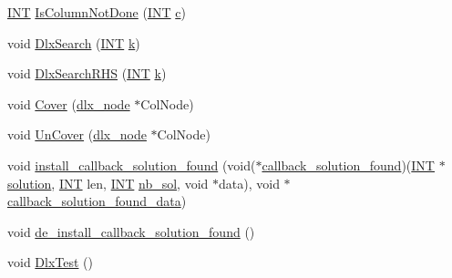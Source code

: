 \begin{DoxyCompactItemize}
\item 
\mbox{\hyperlink{galois_8h_a09fddde158a3a20bd2dcadb609de11dc}{I\+NT}} \mbox{\hyperlink{_l_i_b_2_g_a_l_o_i_s_2dlx_8_c_ade91df62267ccf3ec706530c9057167d}{Is\+Column\+Not\+Done}} (\mbox{\hyperlink{galois_8h_a09fddde158a3a20bd2dcadb609de11dc}{I\+NT}} \mbox{\hyperlink{alphabet2_8_c_a4e1e0e72dd773439e333c84dd762a9c3}{c}})
\item 
void \mbox{\hyperlink{_l_i_b_2_g_a_l_o_i_s_2dlx_8_c_a71f59e229697fd713666715446438998}{Dlx\+Search}} (\mbox{\hyperlink{galois_8h_a09fddde158a3a20bd2dcadb609de11dc}{I\+NT}} \mbox{\hyperlink{simeon_8_c_a43fa990200c3ddd47c35f151bd4d66bf}{k}})
\item 
void \mbox{\hyperlink{_l_i_b_2_g_a_l_o_i_s_2dlx_8_c_acea905e4026b82ace11f244c1c173af7}{Dlx\+Search\+R\+HS}} (\mbox{\hyperlink{galois_8h_a09fddde158a3a20bd2dcadb609de11dc}{I\+NT}} \mbox{\hyperlink{simeon_8_c_a43fa990200c3ddd47c35f151bd4d66bf}{k}})
\item 
void \mbox{\hyperlink{_l_i_b_2_g_a_l_o_i_s_2dlx_8_c_a779523d7d194ac8ee94af5f6c754a3f1}{Cover}} (\mbox{\hyperlink{structdlx__node}{dlx\+\_\+node}} $\ast$Col\+Node)
\item 
void \mbox{\hyperlink{_l_i_b_2_g_a_l_o_i_s_2dlx_8_c_ae438e7c2e37e310d1981d3a7be44613d}{Un\+Cover}} (\mbox{\hyperlink{structdlx__node}{dlx\+\_\+node}} $\ast$Col\+Node)
\item 
void \mbox{\hyperlink{_l_i_b_2_g_a_l_o_i_s_2dlx_8_c_a69c3d94a3b3f3520355fc78794c82783}{install\+\_\+callback\+\_\+solution\+\_\+found}} (void($\ast$\mbox{\hyperlink{_l_i_b_2_g_a_l_o_i_s_2dlx_8_c_a2cb295d6c07a8de393c5107d81da5066}{callback\+\_\+solution\+\_\+found}})(\mbox{\hyperlink{galois_8h_a09fddde158a3a20bd2dcadb609de11dc}{I\+NT}} $\ast$\mbox{\hyperlink{hill_8_c_a260dc4df2fddf5f0fa5dd8d5b8210a11}{solution}}, \mbox{\hyperlink{galois_8h_a09fddde158a3a20bd2dcadb609de11dc}{I\+NT}} len, \mbox{\hyperlink{galois_8h_a09fddde158a3a20bd2dcadb609de11dc}{I\+NT}} \mbox{\hyperlink{plane__search_8_c_a0029b734487624c93c3a72d74a8f2bf9}{nb\+\_\+sol}}, void $\ast$data), void $\ast$\mbox{\hyperlink{_l_i_b_2_g_a_l_o_i_s_2dlx_8_c_ae9d310daba961531412b89f2a32f6b09}{callback\+\_\+solution\+\_\+found\+\_\+data}})
\item 
void \mbox{\hyperlink{_l_i_b_2_g_a_l_o_i_s_2dlx_8_c_a40a0343270b8af73cc8acb1a3806865d}{de\+\_\+install\+\_\+callback\+\_\+solution\+\_\+found}} ()
\item 
void \mbox{\hyperlink{_l_i_b_2_g_a_l_o_i_s_2dlx_8_c_a000422ca8994e7b327aaa5d5dca6b0a3}{Dlx\+Test}} ()
\item 

\end{DoxyCompactItemize}
